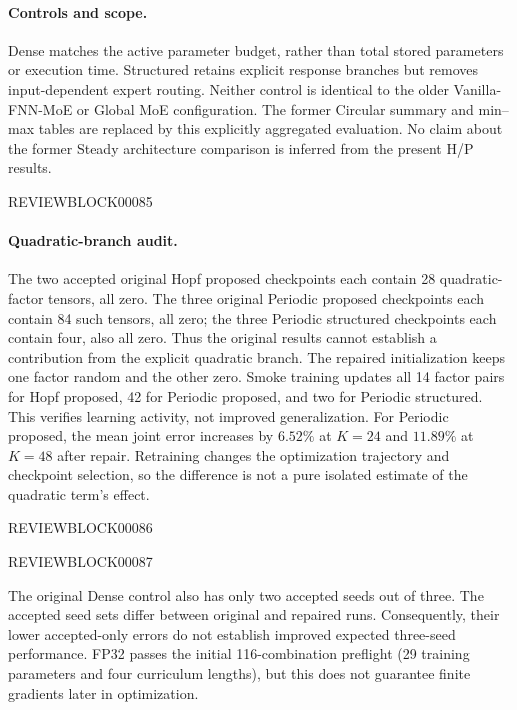 \documentclass{article}
\begin{document}
\paragraph{Controls and scope.}
Dense matches the active parameter budget, rather than total stored
parameters or execution time. Structured retains explicit response
branches but removes input-dependent expert routing. Neither control
is identical to the older Vanilla-FNN-MoE or Global MoE configuration.
The former Circular summary and min--max tables are replaced by this
explicitly aggregated evaluation. No claim about the former Steady
architecture comparison is inferred from the present H/P results.



REVIEWBLOCK00085



\paragraph{Quadratic-branch audit.}
The two accepted original Hopf proposed checkpoints each contain 28
quadratic-factor tensors, all zero. The three original Periodic
proposed checkpoints each contain 84 such tensors, all zero; the three
Periodic structured checkpoints each contain four, also all zero.
Thus the original results cannot establish a contribution from the
explicit quadratic branch. The repaired initialization keeps one factor
random and the other zero. Smoke training updates all 14 factor pairs
for Hopf proposed, 42 for Periodic proposed, and two for Periodic
structured. This verifies learning activity, not improved generalization.
For Periodic proposed, the mean joint error increases by $6.52\%$ at
$K=24$ and $11.89\%$ at $K=48$ after repair. Retraining changes the
optimization trajectory and checkpoint selection, so the difference is
not a pure isolated estimate of the quadratic term's effect.



REVIEWBLOCK00086





REVIEWBLOCK00087



The original Dense control also has only two accepted seeds out of three.
The accepted seed sets differ between original and repaired runs.
Consequently, their lower accepted-only errors do not establish improved
expected three-seed performance. FP32 passes the initial 116-combination
preflight (29 training parameters and four curriculum lengths), but this
does not guarantee finite gradients later in optimization.
\end{document}
